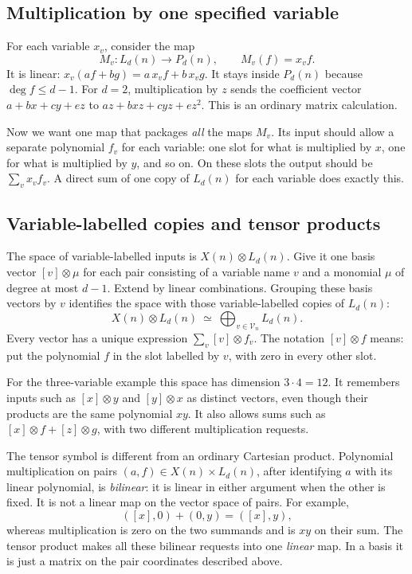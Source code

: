 \subsection{Multiplication by one specified variable}
For each variable $x_v$, consider the map
\[
     M_v:L_d(n)\to P_d(n),\qquad M_v(f)=x_vf.
\]
It is linear: $x_v(af+bg)=a\,x_vf+b\,x_vg$.
It stays inside $P_d(n)$ because $\deg f\le d-1$.
For $d=2$, multiplication by $z$ sends the coefficient vector
$a+bx+cy+ez$ to $az+bxz+cyz+ez^2$.
This is an ordinary matrix calculation.

Now we want one map that packages \emph{all} the maps $M_v$.
Its input should allow a separate polynomial $f_v$ for each variable:
one slot for what is multiplied by $x$, one for what is multiplied by
$y$, and so on. On these slots the output should be
$\sum_v x_vf_v$. A direct sum of one copy of $L_d(n)$ for each
variable does exactly this.

\subsection{Variable-labelled copies and tensor products}\label{tx:sec:tensor-registers}
The space of variable-labelled inputs is $X(n)\otimes L_d(n)$.
Give it one basis vector
$[v]\otimes\mu$ for each pair consisting of a variable name $v$
and a monomial $\mu$ of degree at most $d-1$.
Extend by linear combinations. Grouping these basis vectors by $v$
identifies the space with those variable-labelled copies of $L_d(n)$:
\[
       X(n)\otimes L_d(n)\ \simeq\
                     \bigoplus_{v\in\mathcal V_n}L_d(n).
\]
Every vector has a unique expression $\sum_v[v]\otimes f_v$.
The notation $[v]\otimes f$ means: put the polynomial $f$ in the
slot labelled by $v$, with zero in every other slot.

For the three-variable example this space has dimension $3\cdot4=12$.
It remembers inputs such as $[x]\otimes y$ and $[y]\otimes x$
as distinct vectors, even though their products are the same
polynomial $xy$. It also allows sums such as
$[x]\otimes f+[z]\otimes g$, with two different multiplication requests.

The tensor symbol is different from an ordinary Cartesian product.
Polynomial multiplication on pairs
$(a,f)\in X(n)\times L_d(n)$, after identifying $a$ with its
linear polynomial, is \emph{bilinear}: it is linear in either
argument when the other is fixed. It is not a linear map on the
vector space of pairs. For example,
\[
 ( [x],0)+(0,y)=([x],y),
\]
whereas multiplication is zero on the two summands and is $xy$
on their sum. The tensor product makes all these bilinear requests
into one \emph{linear} map. In a basis it is just a matrix on the
pair coordinates described above.

